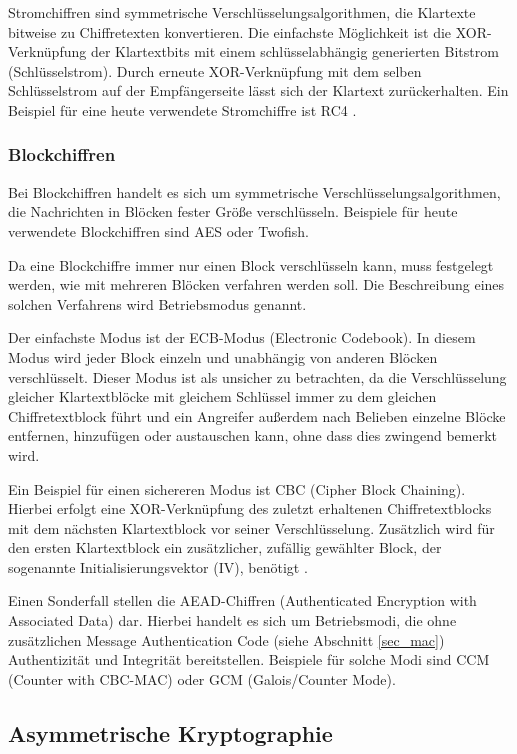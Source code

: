 Stromchiffren sind symmetrische Verschlüsselungsalgorithmen, die Klartexte bitweise zu Chiffretexten konvertieren. Die einfachste Möglichkeit ist die XOR-Verknüpfung der Klartextbits mit einem schlüsselabhängig generierten Bitstrom (Schlüsselstrom). Durch erneute XOR-Verknüpfung mit dem selben Schlüsselstrom auf der Empfängerseite lässt sich der Klartext zurückerhalten. Ein Beispiel für eine heute verwendete Stromchiffre ist RC4 \cite{Schneier2006}.

\subsubsection{Blockchiffren}

\label{sec_block_cipher}

Bei Blockchiffren handelt es sich um symmetrische Verschlüsselungsalgorithmen, die Nachrichten in Blöcken fester Größe verschlüsseln.  Beispiele für heute verwendete Blockchiffren sind AES oder Twofish.

Da eine Blockchiffre immer nur einen Block verschlüsseln kann, muss festgelegt werden, wie mit mehreren Blöcken verfahren werden soll. Die Beschreibung eines solchen Verfahrens wird Betriebsmodus genannt.

Der einfachste Modus ist der ECB-Modus (Electronic Codebook). In diesem Modus wird jeder Block einzeln und unabhängig von anderen Blöcken verschlüsselt. Dieser Modus ist als unsicher zu betrachten, da die Verschlüsselung gleicher Klartextblöcke mit gleichem Schlüssel immer zu dem gleichen Chiffretextblock führt und ein Angreifer außerdem nach Belieben einzelne Blöcke entfernen, hinzufügen oder austauschen kann, ohne dass dies zwingend bemerkt wird.

Ein Beispiel für einen sichereren Modus ist CBC (Cipher Block Chaining). Hierbei erfolgt eine XOR-Verknüpfung des zuletzt erhaltenen Chiffretextblocks mit dem nächsten Klartextblock vor seiner Verschlüsselung. Zusätzlich wird für den ersten Klartextblock ein zusätzlicher, zufällig gewählter Block, der sogenannte Initialisierungsvektor (IV), benötigt \cite{Schneier2006}.

Einen Sonderfall stellen die AEAD-Chiffren (Authenticated Encryption with Associated Data) dar. Hierbei handelt es sich um Betriebsmodi, die ohne zusätzlichen Message Authentication Code (siehe Abschnitt \ref{sec_mac}) Authentizität und Integrität bereitstellen. Beispiele für solche Modi sind CCM (Counter with CBC-MAC) oder GCM (Galois/Counter Mode). 

\subsection{Asymmetrische Kryptographie}

